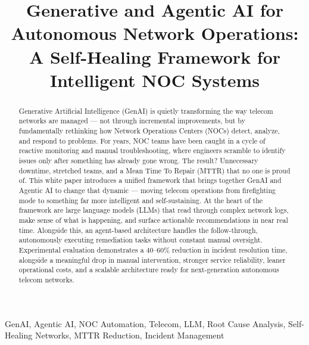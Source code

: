 \documentclass[conference]{IEEEtran}
\begin{document}
\title{Generative and Agentic AI for Autonomous Network Operations: A Self-Healing Framework for Intelligent NOC Systems}

\author{
\and
{}
}

\maketitle

\begin{abstract}
Generative Artificial Intelligence (GenAI) is quietly transforming the way telecom networks are managed --- not through incremental improvements, but by fundamentally rethinking how Network Operations Centers (NOCs) detect, analyze, and respond to problems. For years, NOC teams have been caught in a cycle of reactive monitoring and manual troubleshooting, where engineers scramble to identify issues only after something has already gone wrong. The result? Unnecessary downtime, stretched teams, and a Mean Time To Repair (MTTR) that no one is proud of. This white paper introduces a unified framework that brings together GenAI and Agentic AI to change that dynamic --- moving telecom operations from firefighting mode to something far more intelligent and self-sustaining. At the heart of the framework are large language models (LLMs) that read through complex network logs, make sense of what is happening, and surface actionable recommendations in near real time. Alongside this, an agent-based architecture handles the follow-through, autonomously executing remediation tasks without constant manual oversight. Experimental evaluation demonstrates a 40--60\% reduction in incident resolution time, alongside a meaningful drop in manual intervention, stronger service reliability, leaner operational costs, and a scalable architecture ready for next-generation autonomous telecom networks.
\end{abstract}

\begin{IEEEkeywords}
GenAI, Agentic AI, NOC Automation, Telecom, LLM, Root Cause Analysis, Self-Healing Networks, MTTR Reduction, Incident Management
\end{IEEEkeywords}
\end{document}
